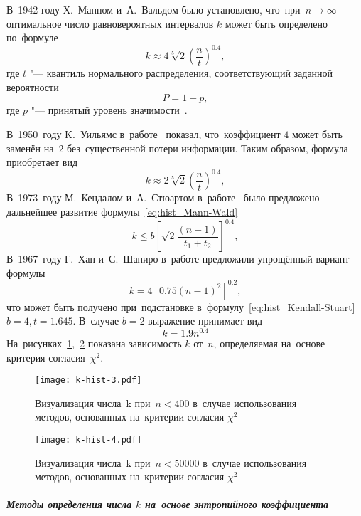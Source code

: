 \documentclass[]{scrartcl}
\begin{document}
В~1942 году Х.~Манном и~А.~Вальдом было установлено, что~при~$n \longrightarrow \infty$ оптимальное число равновероятных интервалов $k$ может быть определено по~формуле
\begin{equation}\label{eq:hist_Mann-Wald}
k \approx 4 \sqrt[5]{2} (\frac{n}{t})^{0.4},
\end{equation}
где $t$ "--- квантиль нормального распределения, соответствующий заданной вероятности
\begin{equation}\label{eq:hist_Mann-Wald1}
P = 1 - p,
\end{equation}
где $p$ "--- принятый уровень значимости~\cite{Mann-Wald:Number-of-Class-Intervals}.

В~1950~году K.~Уильямс в~работе~\cite{Williams:choice-of-k} показал, что~коэффициент $4$ может быть заменён на~$2$ без~существенной потери информации. Таким образом, формула приобретает вид
\begin{equation}\label{eq:hist_Williams}
k \approx 2 \sqrt[5]{2} (\frac{n}{t})^{0.4},
\end{equation}
В~1973~году М.~Кендалом и~А.~Стюартом в~работе~\cite{Stat-vyvody-i-svyazi} было предложено дальнейшее развитие формулы~\ref{eq:hist_Mann-Wald}
\begin{equation}\label{eq:hist_Kendall-Stuart}
k \leq b [\sqrt{2}\frac{(n-1)}{t_{1}+t_{2}}]^{0.4},
\end{equation}
В~1967~году Г.~Хан и~С.~Шапиро в~работе \cite{Hahn&Shapiro:StatModelEng} предложили упрощённый вариант формулы
\begin{equation}\label{eq:hist_Hahn-Shapiro}
k = 4 [0.75 (n-1)^2]^{0.2},
\end{equation}
что может быть получено при~подстановке в~формулу~\ref{eq:hist_Kendall-Stuart} $b = 4, t = 1.645$. В~случае $b = 2$ выражение принимает вид
\begin{equation}\label{eq:hist_Hahn&Shapiro2}
k = 1.9n^{0.4}
\end{equation}
На~рисунках~\ref{fig:k-hist-n3},~\ref{fig:k-hist-n4} показана зависимость $k$ от~$n$, определяемая на~основе критерия согласия~$\chi ^ 2$.
\begin{figure}[ht]
	\centering %
	\texttt{[image: k-hist-3.pdf]}
	\caption{Визуализация числа~k при~$n < 400$ в~случае использования методов, основанных на~критерии согласия $\chi^2$}\label{fig:k-hist-n3}
\end{figure}

\begin{figure}[ht]
	\centering %
	\texttt{[image: k-hist-4.pdf]}
	\caption{Визуализация числа~k при~$n < 50000$ в~случае использования методов, основанных на~критерии согласия $\chi^2$}\label{fig:k-hist-n4}
\end{figure}
\subparagraph{Методы определения числа $k$ на~основе энтропийного коэффициента}\label{k-hist:entrop-methods}
\end{document}
